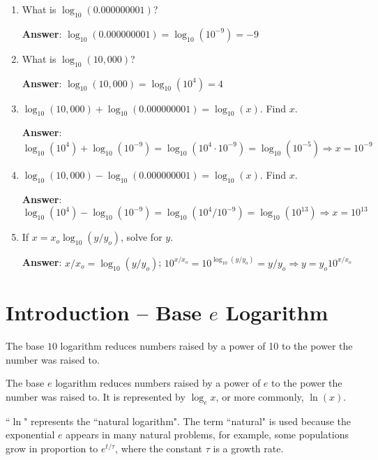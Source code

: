 \documentclass{article}
\begin{document}
\begin{enumerate}

  \item What is $\log_{10}(0.000000001)$?

        \ifsolutions
        \textbf{Answer}: $\log_{10}(0.000000001)=\log_{10}(10^{-9})=-9$
        \else
        \vskip 24pt
        \fi

  \item What is $\log_{10}(10,000)$?

        \ifsolutions
        \textbf{Answer}: $\log_{10}(10,000)=\log_{10}(10^{4})=4$
        \else
        \vskip 24pt
        \fi

  \item $\log_{10}(10,000)+\log_{10}(0.000000001)=\log_{10}(x)$. Find $x$.

        \ifsolutions
        \textbf{Answer}: $\log_{10}(10^{4}) + \log_{10}(10^{-9}) = \log_{10}(10^{4}\cdot 10^{-9}) = \log_{10}(10^{-5})\Rightarrow x = 10^{-9}$
        \else
        \vskip 24pt
        \fi

  \item $\log_{10}(10,000)-\log_{10}(0.000000001)=\log_{10}(x)$. Find $x$.

        \ifsolutions
        \textbf{Answer}: $\log_{10}(10^{4}) - \log_{10}(10^{-9}) = \log_{10}(10^{4}/10^{-9}) = \log_{10}(10^{13})\Rightarrow x = 10^{13}$
        \else
        \vskip 24pt
        \fi

  \item If $x = x_o\log_{10}(y/y_o)$, solve for $y$.

        \ifsolutions
        \textbf{Answer}: $x/x_o = \log_{10}(y/y_o)$; $10^{x/x_o} = 10^{\log_{10}(y/y_o)}=y/y_o \Rightarrow y = y_o10^{x/x_o}$
        \else
        \vskip 24pt
        \fi

\end{enumerate}

\section{Introduction -- Base $e$ Logarithm}

The base $10$ logarithm reduces numbers raised by a power of 10 to the power the number was raised to.

The base $e$ logarithm reduces numbers raised by a power of $e$ to the power the number was raised to. It is represented by $\log_{e}x$, or more commonly, $\ln(x)$.

``$\ln$" represents the ``natural logarithm". The term ``natural" is used because the exponential $e$ appears in many natural problems, for example, some populations grow in proportion to $e^{t/\tau}$, where the constant $\tau$ is a growth rate.
\end{document}
